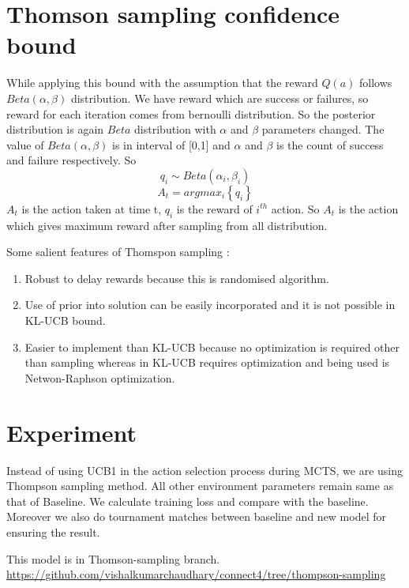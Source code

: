 \section{Thomson sampling confidence bound}
While applying this bound with the assumption that the reward $Q(a)$ follows $Beta(\alpha,\beta)$ distribution. We have reward which are success or failures, so reward for each iteration comes from bernoulli distribution. So the posterior distribution is again $Beta$ distribution with $\alpha$ and $\beta$ parameters changed. The value of $Beta(\alpha,\beta)$ is in interval of [0,1] and $\alpha$ and $\beta$ is the count of success and failure respectively. So
$$ q_{i} \sim Beta(\alpha_{i},\beta_{i}) $$
$$ A_{t} = argmax_{i}\left \lbrace q_{i} \right \rbrace $$
$A_{t}$ is the action taken at time t, $q_{i}$ is the reward of $i^{th}$ action. So $A_{t}$ is the action which gives maximum reward after sampling from all distribution.

Some salient features of Thomspon sampling :
\begin{enumerate}
\item  Robust to delay rewards because this is randomised algorithm.
\item  Use of prior into solution can be easily incorporated and it is not possible in KL-UCB bound.
\item  Easier to implement than KL-UCB because no optimization is required other than sampling whereas in KL-UCB requires optimization and being used is Netwon-Raphson optimization.
\end{enumerate}

\section{Experiment}
Instead of using UCB1 in the action selection process during MCTS, we are using Thompson sampling method. All other environment parameters remain same as that of Baseline. We calculate training loss and compare with the baseline. Moreover we also do tournament matches between baseline and new model for ensuring the result.

This model is in Thomson-sampling branch.
\url{https://github.com/vishalkumarchaudhary/connect4/tree/thompson-sampling}

